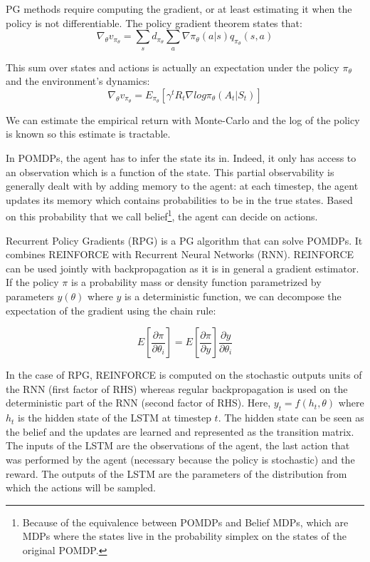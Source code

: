 \documentclass{article} %
\begin{document}
PG methods require computing the gradient, or at least estimating it when the policy is not differentiable. The policy gradient theorem states that:
$$
\nabla_{\theta} v_{\pi_{\theta}} = \sum_s d_{\pi_{\theta}} \sum_a \nabla \pi_{\theta}(a|s) q_{\pi_{\theta}}(s,a) %
$$

This sum over states and actions is actually an expectation under the policy $\pi_{\theta}$ and the environment's dynamics:
$$
\nabla_{\theta} v_{\pi_{\theta}} = E_{\pi_{\theta}}[\gamma^t R_t \nabla log \pi_{\theta}(A_t|S_t)] %
$$

We can estimate the empirical return with Monte-Carlo and the log of the policy is known so this estimate is tractable.


In POMDPs, the agent has to infer the state its in. Indeed, it only has access to an observation which is a function of the state. This partial observability is generally dealt with by adding memory to the agent: at each timestep, the agent updates its memory which contains probabilities to be in the true states. Based on this probability that we call belief\footnote{Because of the equivalence between POMDPs and Belief MDPs, which are MDPs where the states live in the probability simplex on the states of the original POMDP.}, the agent can decide on actions.

Recurrent Policy Gradients\cite{wierstra2010recurrent} (RPG) is a PG algorithm that can solve POMDPs. It combines REINFORCE with Recurrent Neural Networks (RNN). REINFORCE can be used jointly with backpropagation as it is in general a gradient estimator\cite{williams1992simple}. If the policy $\pi$ is a probability mass or density function parametrized by parameters $y(\theta)$ where $y$ is a deterministic function, we can decompose the expectation of the gradient using the chain rule:

$$ E[\frac{\partial \pi}{\partial \theta_i}] = E[\frac{\partial \pi}{\partial y}] \frac{\partial y}{\partial \theta_{i}} $$

In the case of RPG, REINFORCE is computed on the stochastic outputs units of the RNN (first factor of RHS) whereas regular backpropagation is used on the deterministic part of the RNN (second factor of RHS). Here, $y_t = f(h_t, \theta)$ where $h_t$ is the hidden state of the LSTM at timestep $t$. The hidden state can be seen as the belief and the updates are learned and represented as the transition matrix. The inputs of the LSTM are the observations of the agent, the last action that was performed by the agent (necessary because the policy is stochastic) and the reward. The outputs of the LSTM are the parameters of the distribution from which the actions will be sampled.
\end{document}
